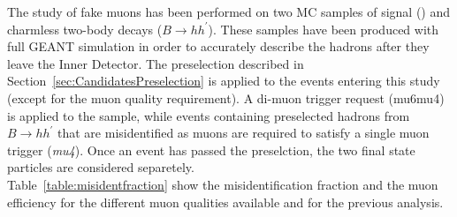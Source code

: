 The study of fake muons has been performed on two MC samples of signal
(\Bsmumu) and charmless two-body decays ($B \to hh^\prime$). %
These samples have been produced with full GEANT simulation in order
to accurately describe the hadrons after they leave the Inner Detector. %
The preselection described in Section~\ref{sec:CandidatesPreselection}
is applied to the events entering this study (except for the muon quality requirement). A di-muon trigger request
 (mu6mu4) is applied to the \Bsmumu sample, while events containing preselected hadrons 
from $B\to hh^\prime$ that are misidentified as muons
are required to satisfy a single muon trigger ({\it{mu4}}). Once an event has 
passed the preselction, the two final state particles are considered separetely.\\
Table~\ref{table:misidentfraction} show the misidentification fraction and the muon efficiency for the different muon qualities available and for the previous analysis.

